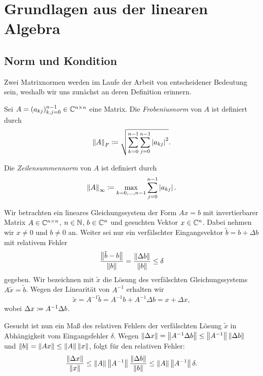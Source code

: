 \chapter{Grundlagen aus der linearen Algebra}
\section{Norm und Kondition}
Zwei Matrixnormen werden im Laufe der Arbeit von entscheidener Bedeutung sein, weshalb wir uns zunächst an deren Definition erinnern.

\begin{mydef}
    Sei $A = (a_{kj})_{k,j=0}^{n-1} \in \mathbb{C}^{n\times n}$ eine Matrix.
    Die \emph{Frobeniusnorm} von $A$ ist definiert durch
    \begin{equation}
        \label{eq:frobenius_norm}
        \left\lVert A \right\rVert_F
        \coloneqq \sqrt{ \sum_{k=0}^{n-1} \sum_{j=0}^{n-1} \left\lvert a_{kj} \right\rvert^2}.
    \end{equation}

    \noindent Die \emph{Zeilensummennorm} von $A$ ist definiert durch
    \begin{equation}
        \label{eq:infinity_norm}
        \left\lVert A \right\rVert_\infty
        \coloneqq \max_{k=0, \dots, n-1} \sum_{j=0}^{n-1} \left\lvert a_{kj} \right\rvert.
    \end{equation}
\end{mydef}

Wir betrachten ein lineares Gleichungssystem der Form
$Ax = b$ mit invertierbarer Matrix
$A \in \mathbb{C}^{n \times n}$, $n \in \mathbb{N}$, $b \in \mathbb{C}^n$
und gesuchten Vektor $x \in \mathbb{C}^n$.
Dabei nehmen wir $x \neq 0$ und $b \neq 0$ an.
Weiter sei nur ein verfälschter Eingangsvektor $\tilde{b} = b + \Delta b$
mit relativem Fehler
\[
    \frac{\left\lVert \tilde{b} - b \right\rVert}{\left\lVert b \right\rVert} = \frac{\left\lVert \Delta b \right\rVert}{\left\lVert b \right\rVert} \leq \delta
\]
gegeben.
Wir bezeichnen mit $\tilde{x}$ die Lösung des verfälschten Gleichungssystems
$A \tilde{x} = \tilde{b}$.
Wegen der Linearität von $A^{-1}$ erhalten wir
\[
    \tilde{x} = A^{-1} \tilde{b} = A^{-1} b + A^{-1} \Delta b = x + \Delta x,
\]
wobei $\Delta x \coloneqq A^{-1} \Delta b$.

\noindent Gesucht ist nun ein Maß des relativen Fehlers der verfälschten Lösung
$\tilde{x}$ in Abhängigkeit vom Eingangsfehler $\delta$.
Wegen $ \left\lVert \Delta x \right\rVert = \left\lVert A^{-1} \Delta b \right\rVert \leq \left\lVert A^{-1} \right\rVert \left\lVert \Delta b \right\rVert $
und $ \left\lVert b \right\rVert = \left\lVert A x \right\rVert \leq \left\lVert A \right\rVert \left\lVert x \right\rVert $,
folgt für den relativen Fehler:
\[
    \frac{\left\lVert \Delta x \right\rVert}{\left\lVert x \right\rVert} \leq \left\lVert A \right\rVert \left\lVert A^{-1} \right\rVert \frac{\left\lVert \Delta b \right\rVert}{\left\lVert b \right\rVert} \leq \left\lVert A \right\rVert \left\lVert A^{-1} \right\rVert \delta.
\]

